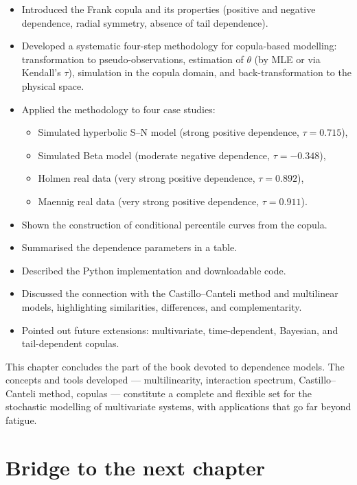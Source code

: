 \begin{itemize}
    \item Introduced the Frank copula and its properties (positive and negative dependence, radial symmetry, absence of tail dependence).
    \item Developed a systematic four-step methodology for copula-based modelling: transformation to pseudo-observations, estimation of \(\theta\) (by MLE or via Kendall's \(\tau\)), simulation in the copula domain, and back-transformation to the physical space.
    \item Applied the methodology to four case studies:
        \begin{itemize}
            \item Simulated hyperbolic S–N model (strong positive dependence, \(\tau = 0.715\)),
            \item Simulated Beta model (moderate negative dependence, \(\tau = -0.348\)),
            \item Holmen real data (very strong positive dependence, \(\tau = 0.892\)),
            \item Maennig real data (very strong positive dependence, \(\tau = 0.911\)).
        \end{itemize}
    \item Shown the construction of conditional percentile curves from the copula.
    \item Summarised the dependence parameters in a table.
    \item Described the Python implementation and downloadable code.
    \item Discussed the connection with the Castillo–Canteli method and multilinear models, highlighting similarities, differences, and complementarity.
    \item Pointed out future extensions: multivariate, time-dependent, Bayesian, and tail-dependent copulas.
\end{itemize}

This chapter concludes the part of the book devoted to dependence models. The concepts and tools developed — multilinearity, interaction spectrum, Castillo–Canteli method, copulas — constitute a complete and flexible set for the stochastic modelling of multivariate systems, with applications that go far beyond fatigue.


\section*{Bridge to the next chapter}


